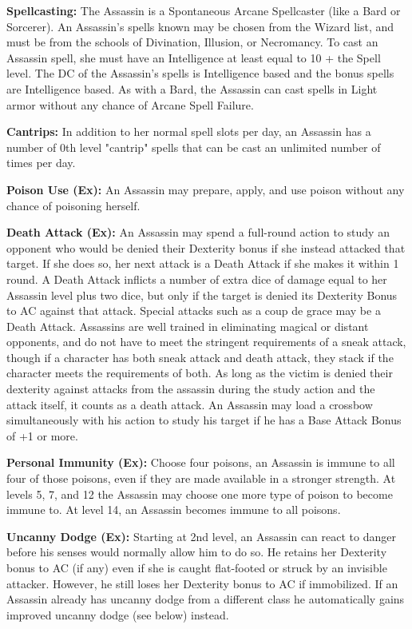 \textbf{Spellcasting:} The Assassin is a Spontaneous Arcane Spellcaster (like a Bard or Sorcerer). An Assassin's spells known may be chosen from the Wizard list, and must be from the schools of Divination, Illusion, or Necromancy. To cast an Assassin spell, she must have an Intelligence at least equal to 10 + the Spell level. The DC of the Assassin's spells is Intelligence based and the bonus spells are Intelligence based. As with a Bard, the Assassin can cast spells in Light armor without any chance of Arcane Spell Failure.

\textbf{Cantrips:} In addition to her normal spell slots per day, an Assassin has a number of 0th level "cantrip" spells that can be cast an unlimited number of times per day.

\textbf{Poison Use (Ex):} An Assassin may prepare, apply, and use poison without any chance of poisoning herself.

\textbf{Death Attack (Ex):} An Assassin may spend a full-round action to study an opponent who would be denied their Dexterity bonus if she instead attacked that target. If she does so, her next attack is a Death Attack if she makes it within 1 round. A Death Attack inflicts a number of extra dice of damage equal to her Assassin level plus two dice, but only if the target is denied its Dexterity Bonus to AC against that attack. Special attacks such as a coup de grace may be a Death Attack. Assassins are well trained in eliminating magical or distant opponents, and do not have to meet the stringent requirements of a sneak attack, though if a character has both sneak attack and death attack, they stack if the character meets the requirements of both. As long as the victim is denied their dexterity against attacks from the assassin during the study action and the attack itself, it counts as a death attack. An Assassin may load a crossbow simultaneously with his action to study his target if he has a Base Attack Bonus of +1 or more.

\textbf{Personal Immunity (Ex):} Choose four poisons, an Assassin is immune to all four of those poisons, even if they are made available in a stronger strength. At levels 5, 7, and 12 the Assassin may choose one more type of poison to become immune to. At level 14, an Assassin becomes immune to all poisons.

\textbf{Uncanny Dodge (Ex):} Starting at 2nd level, an Assassin can react to danger before his senses would normally allow him to do so. He retains her Dexterity bonus to AC (if any) even if she is caught flat-footed or struck by an invisible attacker. However, he still loses her Dexterity bonus to AC if immobilized. If an Assassin already has uncanny dodge from a different class he automatically gains improved uncanny dodge (see below) instead.

